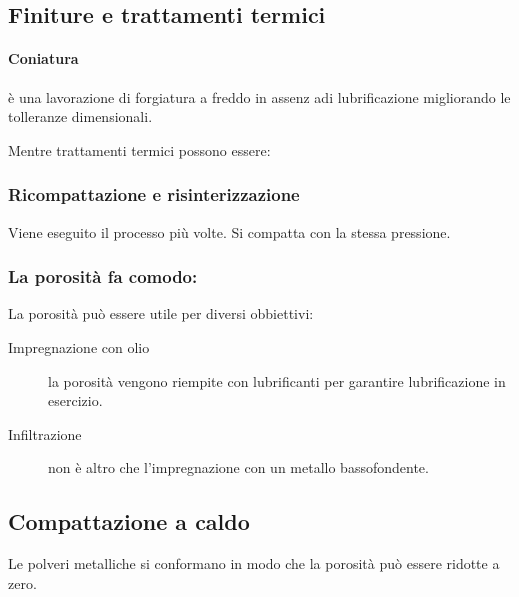 \subsection{Finiture e trattamenti termici}
\paragraph{Coniatura} è una lavorazione di forgiatura a freddo in assenz adi lubrificazione migliorando le tolleranze dimensionali.

Mentre trattamenti termici possono essere:
\subsubsection{Ricompattazione e risinterizzazione} Viene eseguito il processo più volte. Si compatta con la stessa pressione.

\subsubsection{La porosità fa comodo:}
La porosità può essere utile per diversi obbiettivi:
\begin{description}
\item[Impregnazione con olio] la porosità vengono riempite con lubrificanti per garantire lubrificazione in esercizio.
\item[Infiltrazione] non è altro che l'impregnazione con un metallo bassofondente.
\end{description}

\subsection{Compattazione a caldo}
Le polveri metalliche si conformano in modo che la porosità può essere ridotte a zero.


